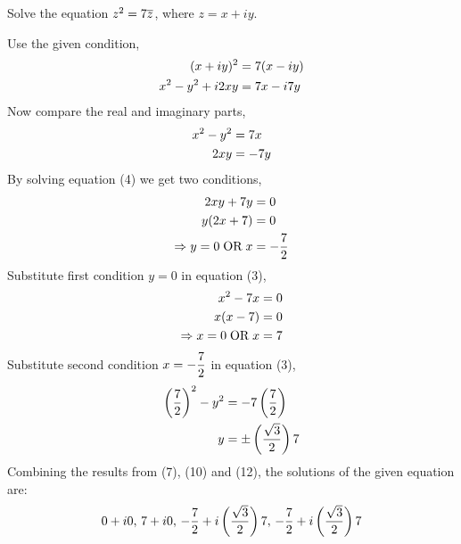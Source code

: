 

\question Solve the equation $z^2=7 \overline{z}$, where $z=x+iy$.

\watchout

\begin{solution}
  Use the given condition,
  \begin{align}
    (x+iy)^2     &= 7(x-iy) \\
    x^2-y^2+i2xy &= 7 x-i7 y
  \end{align}
  Now compare the real and imaginary parts,
  \begin{align}
    x^2-y^2 &= 7 x \\
    2xy     &= -7 y
  \end{align}
  By solving equation (4) we get two conditions,
  \begin{align}
    2xy+7 y &= 0 \\
    y(2x+7) &= 0 \\
    \Rightarrow y=0\;\text{OR}\; x &=-\dfrac{7}{2}
  \end{align}
  Substitute first condition $y=0$ in equation (3),
  \begin{align}
    x^2-7 x &= 0\\
    x(x-7)  &= 0\\
    \Rightarrow x=0\;\text{OR}\; x&=7
  \end{align}
  Substitute second condition $x=-\dfrac{7}{2}$ in equation (3),
  \begin{align}
    \left(\dfrac{7}{2}\right)^2-y^2 &=-7\left(\dfrac{7}{2}\right)\\
    y &=\pm\left(\dfrac{\sqrt{3}}{2}\right)7
  \end{align}
  Combining the results from (7), (10) and (12), the solutions of
  the given equation are:
  \begin{align}
    0+i0,\,7+i0,\,
    -\dfrac{7}{2}+i\left(\dfrac{\sqrt{3}}{2}\right)7,\,
    -\dfrac{7}{2}+i\left(\dfrac{\sqrt{3}}{2}\right)7
  \end{align}
\end{solution}


